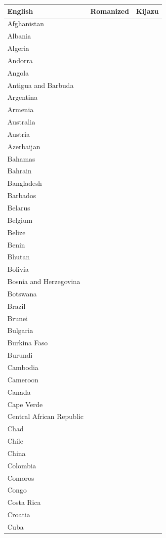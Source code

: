 \documentclass{clgrammar}
\begin{document}
\begin{longtable}{lll}
	English & Romanized & Kijazu \\
	\hline
	Afghanistan &  &  \\
	Albania &  &  \\
	Algeria &  &  \\
	Andorra &  &  \\
	Angola &  &  \\
	Antigua and Barbuda &  &  \\
	Argentina &  &  \\
	Armenia &  &  \\
	Australia &  &  \\
	Austria &  &  \\
	Azerbaijan &  &  \\
	Bahamas &  &  \\
	Bahrain &  &  \\
	Bangladesh &  &  \\
	Barbados &  &  \\
	Belarus &  &  \\
	Belgium &  &  \\
	Belize &  &  \\
	Benin &  &  \\
	Bhutan &  &  \\
	Bolivia &  &  \\
	Bosnia and Herzegovina &  &  \\
	Botswana &  &  \\
	Brazil &  &  \\
	Brunei &  &  \\
	Bulgaria &  &  \\
	Burkina Faso &  &  \\
	Burundi &  &  \\
	Cambodia &  &  \\
	Cameroon &  &  \\
	Canada &  &  \\
	Cape Verde &  &  \\
	Central African Republic &  &  \\
	Chad &  &  \\
	Chile &  &  \\
	China &  &  \\
	Colombia &  &  \\
	Comoros &  &  \\
	Congo &  &  \\
	Costa Rica &  &  \\
	Croatia &  &  \\
	Cuba &  &  \\

\end{longtable}
\end{document}
